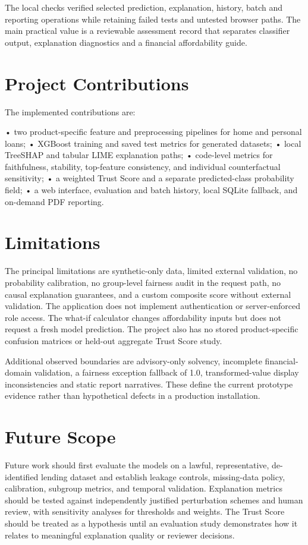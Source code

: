 \documentclass[12pt,a4paper]{report}
\begin{document}
The local checks verified selected prediction, explanation, history, batch and reporting operations while retaining failed tests and untested browser paths. The main practical value is a reviewable assessment record that separates classifier output, explanation diagnostics and a financial affordability guide.

\section{Project Contributions}
The implemented contributions are:

• two product-specific feature and preprocessing pipelines for home and personal loans; • XGBoost training and saved test metrics for generated datasets; • local TreeSHAP and tabular LIME explanation paths; • code-level metrics for faithfulness, stability, top-feature consistency, and individual counterfactual sensitivity; • a weighted Trust Score and a separate predicted-class probability field; • a web interface, evaluation and batch history, local SQLite fallback, and on-demand PDF reporting.

\section{Limitations}
The principal limitations are synthetic-only data, limited external validation, no probability calibration, no group-level fairness audit in the request path, no causal explanation guarantees, and a custom composite score without external validation. The application does not implement authentication or server-enforced role access. The what-if calculator changes affordability inputs but does not request a fresh model prediction. The project also has no stored product-specific confusion matrices or held-out aggregate Trust Score study.

Additional observed boundaries are advisory-only solvency, incomplete financial-domain validation, a fairness exception fallback of 1.0, transformed-value display inconsistencies and static report narratives. These define the current prototype evidence rather than hypothetical defects in a production installation.

\section{Future Scope}
Future work should first evaluate the models on a lawful, representative, de-identified lending dataset and establish leakage controls, missing-data policy, calibration, subgroup metrics, and temporal validation. Explanation metrics should be tested against independently justified perturbation schemes and human review, with sensitivity analyses for thresholds and weights. The Trust Score should be treated as a hypothesis until an evaluation study demonstrates how it relates to meaningful explanation quality or reviewer decisions.
\end{document}
